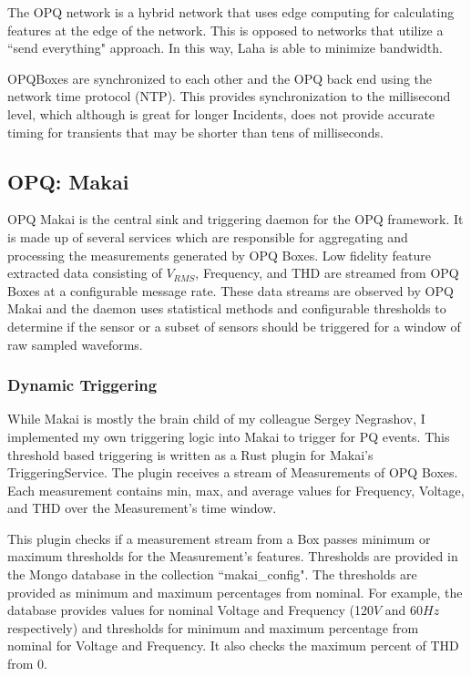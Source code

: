 The OPQ network is a hybrid network that uses edge computing for calculating features at the edge of the network. This is opposed to networks that utilize a ``send everything" approach. In this way, Laha is able to minimize bandwidth.

OPQBoxes are synchronized to each other and the OPQ back end using the network time protocol (NTP). This provides synchronization to the millisecond level, which although is great for longer Incidents, does not provide accurate timing for transients that may be shorter than tens of milliseconds.

\subsection{OPQ: Makai}\label{subsec:opq:-makai}
OPQ Makai is the central sink and triggering daemon for the OPQ framework. It is made up of several services which are responsible for aggregating and processing the measurements generated by OPQ Boxes. Low fidelity feature extracted data consisting of $V_{RMS}$, Frequency, and THD are streamed from OPQ Boxes at a configurable message rate. These data streams are observed by OPQ Makai and the daemon uses statistical methods and configurable thresholds to determine if the sensor or a subset of sensors should be triggered for a window of raw sampled waveforms.

\subsubsection{Dynamic Triggering}\label{subsubsec:dynamic-triggering}

While Makai is mostly the brain child of my colleague Sergey Negrashov, I implemented my own triggering logic into Makai to trigger for PQ events. This threshold based triggering is written as a Rust plugin for Makai's TriggeringService. The plugin receives a stream of Measurements of OPQ Boxes. Each measurement contains min, max, and average values for Frequency, Voltage, and THD over the Measurement's time window.

This plugin checks if a measurement stream from a Box passes minimum or maximum thresholds for the Measurement's features. Thresholds are provided in the Mongo database in the collection ``makai\_config". The thresholds are provided as minimum and maximum percentages from nominal. For example, the database provides values for nominal Voltage and Frequency (120$V$ and 60$Hz$ respectively) and thresholds for minimum and maximum percentage from nominal for Voltage and Frequency. It also checks the maximum percent of THD from 0.

